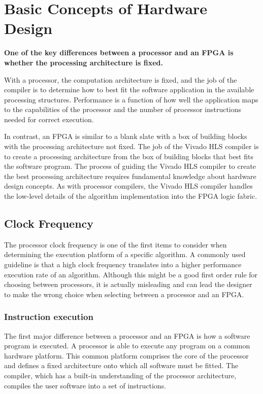 \section{Basic Concepts of Hardware Design}

\textbf{One of the key differences between a processor and an FPGA is whether the processing
architecture is fixed.}

\par With a processor, the computation architecture is fixed, and the job of the compiler is to
determine how to best fit the software application in the available processing structures. Performance is a function of how well the application maps to the capabilities of the
processor and the number of processor instructions needed for correct execution.

\par In contrast, an FPGA is similar to a blank slate with a box of building blocks with the processing architecture not fixed. The job of the Vivado HLS compiler is to create a processing architecture from the box of building blocks that best fits the software program. The process of guiding the Vivado HLS compiler to
create the best processing architecture requires fundamental knowledge about hardware design concepts. As with processor compilers, the Vivado HLS compiler handles the
low-level details of the algorithm implementation into the FPGA logic fabric.

\subsection{Clock Frequency}

The processor clock frequency is one of the first items to consider when determining the
execution platform of a specific algorithm. A commonly used guideline is that a high clock
frequency translates into a higher performance execution rate of an algorithm. Although
this might be a good first order rule for choosing between processors, it is actually
misleading and can lead the designer to make the wrong choice when selecting between a
processor and an FPGA.

\subsubsection{Instruction execution}
The first major difference between a processor and an FPGA is how a software program is
executed. A processor is able to execute any program on a common hardware platform. This
common platform comprises the core of the processor and defines a fixed architecture onto
which all software must be fitted. The compiler, which has a built-in understanding of the
processor architecture, compiles the user software into a set of instructions. 

